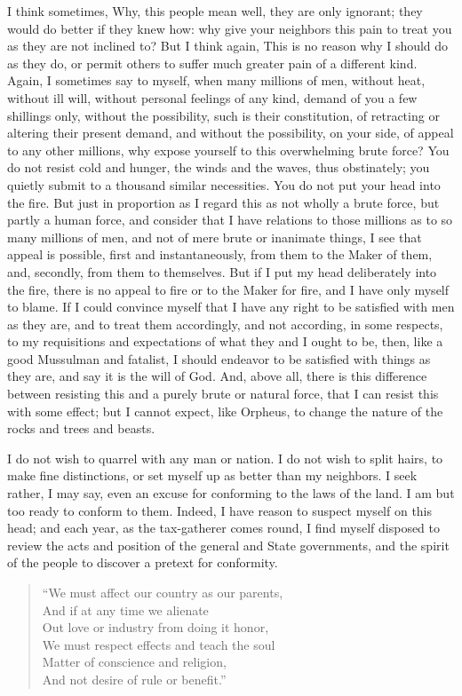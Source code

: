\documentclass[letterpaper,12pt]{article}
\begin{document}
I think sometimes, Why, this people mean well, they are only ignorant; they
would do better if they knew how: why give your neighbors this pain to treat you
as they are not inclined to? But I think again, This is no reason why I should
do as they do, or permit others to suffer much greater pain of a different kind.
Again, I sometimes say to myself, when many millions of men, without heat,
without ill will, without personal feelings of any kind, demand of you a few
shillings only, without the possibility, such is their constitution, of
retracting or altering their present demand, and without the possibility, on
your side, of appeal to any other millions, why expose yourself to this
overwhelming brute force? You do not resist cold and hunger, the winds and the
waves, thus obstinately; you quietly submit to a thousand similar necessities.
You do not put your head into the fire. But just in proportion as I regard this
as not wholly a brute force, but partly a human force, and consider that I have
relations to those millions as to so many millions of men, and not of mere brute
or inanimate things, I see that appeal is possible, first and instantaneously,
from them to the Maker of them, and, secondly, from them to themselves. But if
I put my head deliberately into the fire, there is no appeal to fire or to the
Maker for fire, and I have only myself to blame. If I could convince myself that
I have any right to be satisfied with men as they are, and to treat them
accordingly, and not according, in some respects, to my requisitions and
expectations of what they and I ought to be, then, like a good Mussulman and
fatalist, I should endeavor to be satisfied with things as they are, and say it
is the will of God. And, above all, there is this difference between resisting
this and a purely brute or natural force, that I can resist this with some
effect; but I cannot expect, like Orpheus, to change the nature of the rocks and
trees and beasts.

I do not wish to quarrel with any man or nation. I do not wish to split hairs,
to make fine distinctions, or set myself up as better than my neighbors. I seek
rather, I may say, even an excuse for conforming to the laws of the land. I am
but too ready to conform to them. Indeed, I have reason to suspect myself on
this head; and each year, as the tax-gatherer comes round, I find myself
disposed to review the acts and position of the general and State governments,
and the spirit of the people to discover a pretext for conformity.

\begin{verse}
    \enquote{We must affect our country as our parents, \\
        And if at any time we alienate \\
        Out love or industry from doing it honor, \\
        We must respect effects and teach the soul \\
        Matter of conscience and religion, \\
        And not desire of rule or benefit.}
\end{verse}
\end{document}
